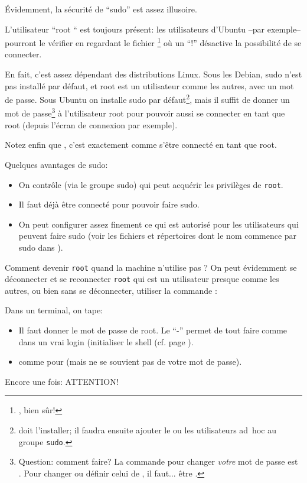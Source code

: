 Évidemment, la sécurité de ``sudo'' est assez illusoire.

L'utilisateur ``root `` est toujours présent: les
utilisateurs d'Ubuntu --par exemple-- pourront le vérifier en regardant
le fichier  \footnote{, bien sûr!} où un
``!'' désactive la possibilité de se connecter.

En fait, c'est assez dépendant des distributions Linux. Sous les
Debian, sudo n'est pas installé par défaut, et root est
un utilisateur comme les autres, avec un mot de passe. Sous Ubuntu on
installe sudo par défaut\footnote{ doit
  l'installer; il faudra ensuite ajouter le ou les utilisateurs ad~hoc
  au groupe \texttt{sudo}.}, mais il suffit de donner un 
mot de passe\footnote{Question: comment faire? La commande pour changer
  \emph{votre} mot de passe est . Pour changer ou définir
  celui de , il faut... être .} à l'utilisateur root pour pouvoir aussi se connecter en tant
que root (depuis l'écran de connexion par exemple).

Notez enfin que , c'est exactement comme s'être connecté en
tant que root.

Quelques avantages de sudo:
\begin{itemize}
\item On contrôle (via le groupe sudo) qui peut acquérir les
  privilèges de  \texttt{root}.
\item Il faut déjà être connecté pour pouvoir faire sudo.
\item On peut configurer assez finement ce qui est autorisé pour les
  utilisateurs qui peuvent faire sudo (voir les fichiers et
  répertoires dont le nom commence par sudo dans ).
\end{itemize}


Comment devenir \texttt{root} quand la machine  n'utilise pas
? On peut 
évidemment se déconnecter et se reconnecter \texttt{root} qui est un
utilisateur presque comme les autres, ou bien sans se déconnecter,
utiliser la commande :

\begin{center}
\end{center}

Dans un terminal, on tape:
\begin{itemize}
\item {}

  Il faut donner le mot de passe de root. Le ``-'' permet  de tout faire comme
  dans un vrai login (initialiser le shell (cf. page \pageref{initshell}).

\item {}

  comme pour  (mais  ne se
  souvient pas de votre mot de passe).
\end{itemize}

\small{\textdbend}  Encore une fois: ATTENTION!
